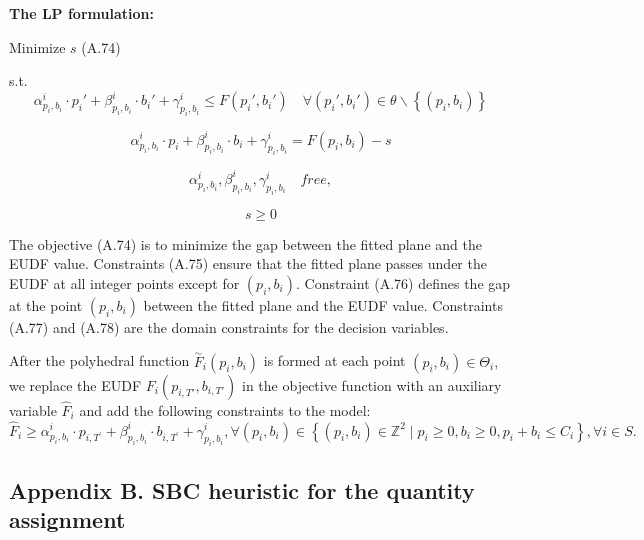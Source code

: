 \documentclass[
  english,
]{article}
\begin{document}
\begin{otherlanguage}{english}
\protect{}\label{p0760}
\textbf{The LP formulation:}

\protect{}\label{p0765}
Minimize \(s\) (A.74)

\protect{}\label{p0770}
s.t.\[\tag{A.75}\alpha_{p_{i},b_{i}}^{i} \cdot p_{i}' + \beta_{p_{i},b_{i}}^{i} \cdot b_{i}' + \gamma_{p_{i},b_{i}}^{i} \leq F\left( {p_{i}',b_{i}'} \right)\quad\forall\left( {p_{i}',b_{i}'} \right)\left. \in \theta\backslash \right.\left\{ \left( {p_{i},b_{i}} \right) \right\}\]

\[\tag{A.76}\alpha_{p_{i},b_{i}}^{i} \cdot p_{i} + \beta_{p_{i},b_{i}}^{i} \cdot b_{i} + \gamma_{p_{i},b_{i}}^{i} = F\left( {p_{i},b_{i}} \right) - s\]

\[\tag{A.77}\alpha_{p_{i},b_{i}}^{i},\beta_{p_{i},b_{i}}^{i},\gamma_{p_{i},b_{i}}^{i}\quad{free},\]

\[\tag{A.78}s \geq 0\]

\protect{}\label{p0775}
The objective (A.74) is to minimize the gap between the fitted plane and the EUDF value. Constraints
(A.75) ensure that the fitted plane passes under the EUDF at all integer points except for
\(\left( {p_{i},b_{i}} \right)\). Constraint (A.76) defines the gap at the point
\(\left( {p_{i},b_{i}} \right)\) between the fitted plane and the EUDF value. Constraints (A.77) and
(A.78) are the domain constraints for the decision variables.

\protect{}\label{p0780}
After the polyhedral function \({\overset{\sim}{F}}_{i}\left( {p_{i},b_{i}} \right)\) is formed at
each point \(\left( {p_{i},b_{i}} \right) \in \Theta_{i},\) we replace the EUDF
\(F_{i}\left( {p_{i,T'},b_{i,T'}} \right)\) in the objective function with an auxiliary variable
\({\widehat{F}}_{i}\) and add the following constraints to the
model:\[\tag{A.79}{\hat{F}}_{i} \geq \alpha_{p_{i},b_{i}}^{i} \cdot p_{i,T^{'}} + \beta_{p_{i},b_{i}}^{i} \cdot b_{i,T^{'}} + \gamma_{p_{i},b_{i}}^{i},\forall\left( {p_{i},b_{i}} \right) \in \left\{ {\left( {p_{i},b_{i}} \right) \in {\mathbb{Z}}^{2} \mid p_{i} \geq 0,b_{i} \geq 0,p_{i} + b_{i} \leq C_{i}} \right\},\forall i \in S.\]

\protect{}\label{s0150}
\subsection{Appendix B. SBC heuristic for the quantity assignment}\label{st180}


\end{otherlanguage}
\end{document}
